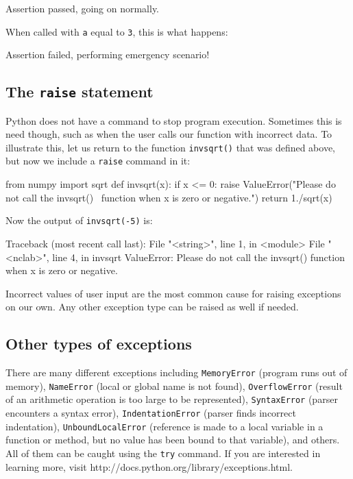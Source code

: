 \begin{bluecode}
Assertion passed, going on normally.
\end{bluecode}
When called with {\tt a} equal to {\tt 3}, this is what happens:

\begin{bluecode}
Assertion failed, performing emergency scenario!
\end{bluecode}

\subsection{The {\tt raise} statement}

Python does not have a command to stop program execution. Sometimes this is
need though, such as when the user calls our function with incorrect data. 
To illustrate this, let us return to the function {\tt invsqrt()} that was 
defined above, but now we include a {\tt raise} command in it:
 
\begin{bluecode}
from numpy import sqrt
def invsqrt(x):
    if x <= 0:
      raise ValueError("Please do not call the invsqrt() \
function when x is zero or negative.")
    return 1./sqrt(x)
\end{bluecode}
Now the output of {\tt invsqrt(-5)} is:

\begin{bluecode}
Traceback (most recent call last):
  File "<string>", line 1, in <module>
  File "<nclab>", line 4, in invsqrt
ValueError: Please do not call the invsqrt() 
function when x is zero or negative.
\end{bluecode}
Incorrect values of user input are the most common cause for raising 
exceptions on our own. Any other exception type can be raised as well
if needed.

\subsection{Other types of exceptions}

There are many different exceptions including {\tt MemoryError} (program runs out of memory),
{\tt NameError} (local or global name is not found), {\tt OverflowError} (result of an arithmetic 
operation is too large to be represented), {\tt SyntaxError} (parser encounters a syntax error),
{\tt IndentationError} (parser finds incorrect indentation), {\tt UnboundLocalError} (reference 
is made to a local variable in a function or method, but no value has been bound to that variable),
and others. All of them can be caught using the {\tt try} command. If you are interested in 
learning more, visit http://docs.python.org/library/exceptions.html.

